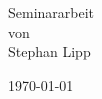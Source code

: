 \begin{titlepage}
	
	{\large Seminararbeit}\\[1.5mm]
	von\\[1.5mm]
	{\large Stephan Lipp}
	
	
	\vfill\vfill\vfill %
	
	{\large\today} %
	
	
	 
	
	\vfill %
	
\end{titlepage}
